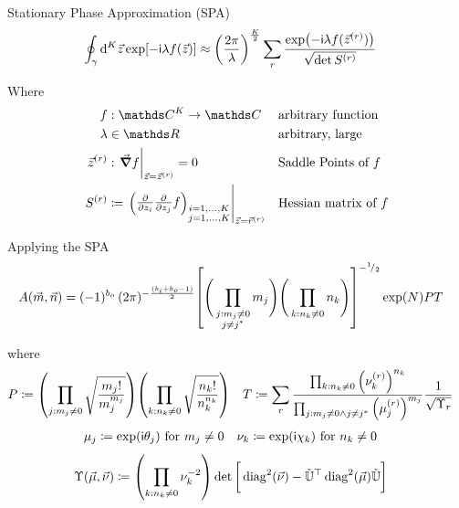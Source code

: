 
\begin{frame}{Stationary Phase Approximation (SPA)}
%
\begin{align*}
	\oint_{\gamma} \dd[K]{\vec{z}}
		\exp[-\mathsf{i} \lambda f(\vec{z})]
&\approx
	\qty( \frac
		{2\pi}
		{\lambda}
	)^{\frac{K}{2}}
	\sum_{r}
		\frac
		{\exp(-\mathsf{i} \lambda f(\vec{z}^{(r)}))}
		{\sqrt{\det S^{(r)}}}
\end{align*}

Where
\begin{align*}
	f &: \setComplex^{K} \to \setComplex 													&& \text{arbitrary function} \\
	\lambda & \in \setReals																				&& \text{arbitrary, large} \\
	\vec{z}^{(r)} &: \eval{\grad f}_{\vec{z} = \vec{z}^{(r)}} = 0		&& \text{Saddle Points of } f \\
	S^{(r)} &\coloneqq
		\eval{
		\mqty(
			\pdv{z_i} \pdv{z_j} f
		)_{\substack{
				i=1, \ldots, K\\
				j=1, \ldots, K
			}}
		}_{\vec{z} = \vec{r}^{(r)}}
	&& \text{Hessian matrix of }f
\end{align*}
%
\end{frame}


\begin{frame}{Applying the SPA}
%
\vspace{-15pt}
\begin{align*}
	A(\vec{m}, \vec{n})
&=
	(-1)^{b_o} \,	
	(2\pi)^{-\frac{(b_i + b_o - 1)}{2}}
	\qty[
		{\Bigg(} \prod_{\substack{j : m_j \neq 0\\j \neq j^*}} m_j {\Bigg)}
		{\Bigg(} \prod_{          k : n_k \neq 0             } n_k {\Bigg)}
	]^{-{}^ {1} \!/_ {2}}
	\exp(N) PT
\end{align*}

where
\begin{align*}
	P
&\coloneqq
	\qty( \prod_{j : m_j \neq 0}
		\sqrt{\frac
			{ m_j! }
			{ m_j^{m_j} }
		}
	)
	\qty( \prod_{k : n_k \neq 0}
		\sqrt{\frac
			{ n_k! }
			{ n_k^{n_k} }
		}
	)
&
	T
&\coloneqq
	\sum_{r}	
		\frac
			{\prod_{k : n_k \neq 0}                  \qty(\nu_k^{(r)})^{n_k}}
			{\prod_{j : m_j \neq 0 \land j \neq j^*} \qty(\mu_j^{(r)})^{m_j}}
		\frac{1}{\sqrt{\Upsilon_r}}
\end{align*}
%
\begin{align*}
	\mu_j
&\coloneqq
	\exp(\mathsf{i} \theta_j) \text{ for } m_j \neq 0
&
	\nu_k
&\coloneqq
	\exp(\mathsf{i} \chi  _k) \text{ for } n_k \neq 0
\end{align*}
%
\begin{align*}
	\Upsilon(\vec{\mu}, \vec{\nu})
&\coloneqq
	\qty( \prod_{k: n_k \neq 0} \nu_k^{-2} )
		\det\qty[\bigg.
				\operatorname{diag}^2(\vec{\nu})
			-
			\tilde{\mathbb{U}}^\top
			\operatorname{diag}^2(\vec{\mu})
			\tilde{\mathbb{U}}
		]
\end{align*}
%
\end{frame}


